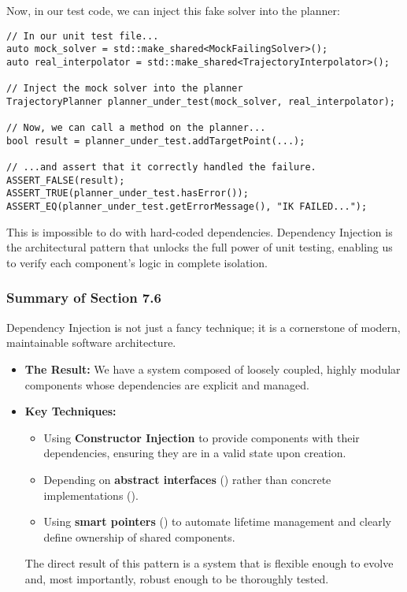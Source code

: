 Now, in our test code, we can inject this fake solver into the planner:

\begin{verbatim}
// In our unit test file...
auto mock_solver = std::make_shared<MockFailingSolver>();
auto real_interpolator = std::make_shared<TrajectoryInterpolator>();

// Inject the mock solver into the planner
TrajectoryPlanner planner_under_test(mock_solver, real_interpolator);

// Now, we can call a method on the planner...
bool result = planner_under_test.addTargetPoint(...);

// ...and assert that it correctly handled the failure.
ASSERT_FALSE(result);
ASSERT_TRUE(planner_under_test.hasError());
ASSERT_EQ(planner_under_test.getErrorMessage(), "IK FAILED...");
\end{verbatim}
\label{fig:injecting-mock}


This is impossible to do with hard-coded dependencies. Dependency Injection is the architectural pattern that unlocks the full power of unit testing, enabling us to verify each component's logic in complete isolation.

\newpage
\subsubsection{Summary of Section 7.6}
\label{subsubsec:section7-6-summary}
Dependency Injection is not just a fancy technique; it is a cornerstone of modern, maintainable software architecture.
\begin{itemize}
    \item \textbf{The Result:} We have a system composed of loosely coupled, highly modular components whose dependencies are explicit and managed.
    \item \textbf{Key Techniques:}
    \begin{itemize}
        \item Using \textbf{Constructor Injection} to provide components with their dependencies, ensuring they are in a valid state upon creation.
        \item Depending on \textbf{abstract interfaces} () rather than concrete implementations ().
        \item Using \textbf{smart pointers} () to automate lifetime management and clearly define ownership of shared components.
    \end{itemize}
    The direct result of this pattern is a system that is flexible enough to evolve and, most importantly, robust enough to be thoroughly tested.
\end{itemize}








